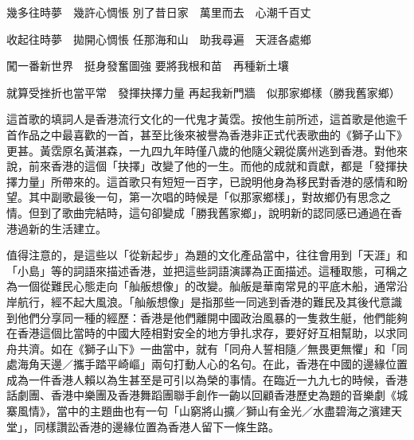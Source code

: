 \begin{displayquote}
    幾多往時夢　幾許心惆悵
    別了昔日家　萬里而去　心潮千百丈

    收起往時夢　拋開心惆悵
    任那海和山　助我尋遍　天涯各處鄉

    闖一番新世界　挺身發奮圖強
    要將我根和苗　再種新土壤
    
    就算受挫折也當平常　發揮抉擇力量
    再起我新門牆　似那家鄉樣（勝我舊家鄉）
\end{displayquote}


這首歌的填詞人是香港流行文化的一代鬼才黃霑。按他生前所述，這首歌是他逾千首作品之中最喜歡的一首，甚至比後來被譽為香港非正式代表歌曲的《獅子山下》更甚。黃霑原名黃湛森，一九四九年時僅八歲的他隨父親從廣州逃到香港。對他來說，前來香港的這個「抉擇」改變了他的一生。而他的成就和貢獻，都是「發揮抉擇力量」所帶來的。這首歌只有短短一百字，已說明他身為移民對香港的感情和盼望。其中副歌最後一句，第一次唱的時候是「似那家鄉樣」，對故鄉仍有思念之情。但到了歌曲完結時，這句卻變成「勝我舊家鄉」，說明新的認同感已通過在香港過新的生活建立。

值得注意的，是這些以「從新起步」為題的文化產品當中，往往會用到「天涯」和「小島」等的詞語來描述香港，並把這些詞語演譯為正面描述。這種取態，可稱之為一個從難民心態走向「舢舨想像」的改變。舢舨是華南常見的平底木船，通常沿岸航行，經不起大風浪。「舢舨想像」是指那些一同逃到香港的難民及其後代意識到他們分享同一種的經歷：香港是他們離開中國政治風暴的一隻救生艇，他們能夠在香港這個比當時的中國大陸相對安全的地方爭扎求存，要好好互相幫助，以求同舟共濟。如在《獅子山下》一曲當中，就有「同舟人誓相隨／無畏更無懼」和「同處海角天邊／攜手踏平崎嶇」兩句打動人心的名句。在此，香港在中國的邊緣位置成為一件香港人賴以為生甚至是可引以為榮的事情。在臨近一九九七的時候，香港話劇團、香港中樂團及香港舞蹈團聯手創作一齣以回顧香港歷史為題的音樂劇《城寨風情》，當中的主題曲也有一句「山窮將山擴／獅山有金光／水盡碧海之濱建天堂」，同樣讚訟香港的邊緣位置為香港人留下一條生路。


